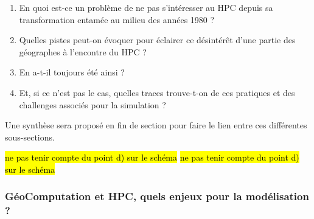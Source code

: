 \begin{enumerate}[label=(\alph*),labelindent=\parindent,leftmargin=*]
\item En quoi est-ce un problème de ne pas s'intéresser au HPC depuis sa transformation entamée au milieu des années 1980 ?
\item Quelles pistes peut-on évoquer pour éclairer ce désintérêt d'une partie des géographes à l'encontre du HPC ?
\item En a-t-il toujours été ainsi ?
\item Et, si ce n'est pas le cas, quelles traces trouve-t-on de ces pratiques et des challenges associés pour la simulation ?
\end{enumerate}

Une synthèse sera proposé en fin de section pour faire le lien entre ces différentes sous-sections.

\hl{ne pas tenir compte du point d) sur le schéma}
\hl{ne pas tenir compte du point d) sur le schéma}



\subsubsection{GéoComputation et HPC, quels enjeux pour la modélisation ? }
\label{sssec:enjeuxHPC}

